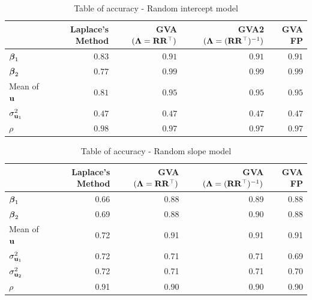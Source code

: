 \documentclass{article}[12pt]
\begin{document}
\begin{table}
\caption{Table of accuracy - Random intercept model}
\label{tab:accuracy_int}
\begin{tabular}{|l|rrrr|}
\hline
& Laplace's Method & GVA $({\boldsymbol \Lambda} = {\bf R} {\bf R}^\top)$ & GVA2 $({\boldsymbol \Lambda} = ({\bf R} {\bf R}^\top)^{-1})$ & GVA FP\\
\hline
${\boldsymbol \beta}_1$ & $0.83$ & $0.91$ & $0.91$ & $0.91$ \\ 
${\boldsymbol \beta}_2$ & $0.77$ & $0.99$ & $0.99$ & $0.99$ \\ 
Mean of ${\bf u}$ & $0.81$ & $0.95$ & $0.95$ & $0.95$ \\
$\sigma^2_{{\bf u}_1}$ & $0.47$ & $0.47$ & $0.47$ & $0.47$ \\ 
$\rho$ & $0.98$ & $0.97$ & $0.97$ &  $0.97$ \\ 
\hline
\end{tabular}
\end{table}

\begin{table}
\caption{Table of accuracy - Random slope model}
\label{tab:accuracy_slope}
\begin{tabular}{|l|rrrr|}
\hline
& Laplace's Method & GVA $({\boldsymbol \Lambda} = {\bf R} {\bf R}^\top)$ & GVA $({\boldsymbol \Lambda} = ({\bf R} {\bf R}^\top)^{-1})$ & GVA FP\\
\hline
${\boldsymbol \beta}_1$     &0.66&0.88&0.89&0.88\\
${\boldsymbol \beta}_2$     &0.69&0.88&0.90&0.88\\
Mean of ${\bf u}$        &0.72&0.91&0.91&0.91\\
$\sigma^2_{{\bf u}_1}$ &0.72&0.71&0.71&0.69\\
$\sigma^2_{{\bf u}_2}$ &0.72&0.71&0.71&0.70\\
$\rho$ &0.91&0.90&0.90&0.90\\
\hline
\end{tabular}
\end{table}

\end{document}
